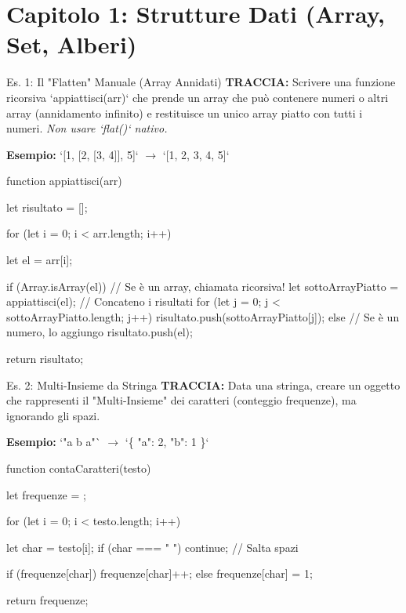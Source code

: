 \section{Capitolo 1: Strutture Dati (Array, Set, Alberi)}

\begin{esercizio}{Es. 1: Il "Flatten" Manuale (Array Annidati)}
\textbf{TRACCIA:} Scrivere una funzione ricorsiva `appiattisci(arr)` che prende un array che può contenere numeri o altri array (annidamento infinito) e restituisce un unico array piatto con tutti i numeri.
\textit{Non usare `flat()` nativo.}

\textbf{Esempio:} `[1, [2, [3, 4]], 5]` $\to$ `[1, 2, 3, 4, 5]`
\end{esercizio}

\begin{jsbox}
function appiattisci(arr) {
    let risultato = [];
    
    for (let i = 0; i < arr.length; i++) {
        let el = arr[i];
        
        if (Array.isArray(el)) {
            // Se è un array, chiamata ricorsiva!
            let sottoArrayPiatto = appiattisci(el);
            // Concateno i risultati
            for (let j = 0; j < sottoArrayPiatto.length; j++) {
                risultato.push(sottoArrayPiatto[j]);
            }
        } else {
            // Se è un numero, lo aggiungo
            risultato.push(el);
        }
    }
    return risultato;
}
\end{jsbox}

\begin{esercizio}{Es. 2: Multi-Insieme da Stringa}
\textbf{TRACCIA:} Data una stringa, creare un oggetto che rappresenti il "Multi-Insieme" dei caratteri (conteggio frequenze), ma ignorando gli spazi.

\textbf{Esempio:} `"a b a"` $\to$ `\{ "a": 2, "b": 1 \}`
\end{esercizio}

\begin{jsbox}
function contaCaratteri(testo) {
    let frequenze = {};
    
    for (let i = 0; i < testo.length; i++) {
        let char = testo[i];
        if (char === " ") continue; // Salta spazi
        
        if (frequenze[char]) {
            frequenze[char]++;
        } else {
            frequenze[char] = 1;
        }
    }
    return frequenze;
}
\end{jsbox}

